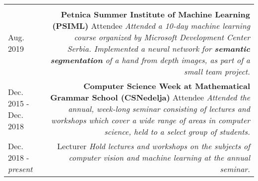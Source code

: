 \documentclass{article}
\newcommand{\mainitem}[3] {
    \textbf{#1}  \newline #2 \vskip5pt  \textit{#3} 
    \vspace{6pt}    %
}
\newenvironment{cvtable} {
	\hspace{-20pt} \begin{tabular}{L!{\color{line_color}\vrule width 1pt}D} %
} 
{\end{tabular}}
\begin{document}
\begin{cvtable}
{    				}
            \\
            Aug. 2019 & 
    		    \mainitem
    				{Petnica Summer Institute of Machine Learning (PSIML)}
    				{Attendee} 
    				{   
    				    Attended a 10-day machine learning course organized by Microsoft Development Center Serbia. Implemented a neural network for \textbf{semantic segmentation} of a hand from depth images, as part of a small team project.
                    }   
            \\
            Dec. 2015 - Dec. 2018 & 
                \mainitem
    				{Computer Science Week at Mathematical Grammar School (CSNedelja)}
    				{Attendee}
    				{
    				    Attended the annual, week-long seminar consisting of lectures and workshops which cover a wide range of areas in computer science, held to a select group of students.
    				}
            \\
            \vspace{-3pt}Dec. 2018 - \textit{present} & 
                \mainitem
    				{\vspace{-15pt}}
    				{Lecturer}
    				{
    					Hold lectures and workshops on the subjects of computer vision and machine learning at the annual seminar.
    				}
    	\end{cvtable}
    

            
    \newpage
    
\end{document}
